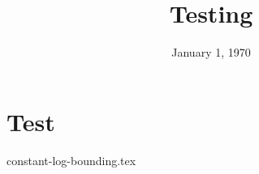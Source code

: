 \documentclass{exam}
\title{Testing}
\date{January 1, 1970}
\begin{document}
\maketitle

\section{Test}
\begin{questions}
{constant-log-bounding.tex}
\end{questions}
\end{document}
